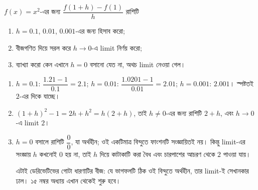 \documentclass[11pt]{article}
\begin{document}
 $f(x) = x^{2}$-এর জন্য $\dfrac{f(1+h)-f(1)}{h}$ রাশিটি
\begin{enumerate}
  \item $h = 0.1$, $0.01$, $0.001$-এর জন্য হিসাব করো;
  \item বীজগণিত দিয়ে সরল করে $h \to 0$-এ limit নির্ণয় করো;
  \item ব্যাখ্যা করো কেন এখানে $h = 0$ বসানো যেত না, অথচ limit নেওয়া গেল।
\end{enumerate}

\begin{sol}
\begin{enumerate}
  \item $h = 0.1$: $\dfrac{1.21-1}{0.1} = 2.1$;
        $h = 0.01$: $\dfrac{1.0201-1}{0.01} = 2.01$;
        $h = 0.001$: $2.001$। স্পষ্টতই $2$-এর দিকে যাচ্ছে।
  \item $(1+h)^{2} - 1 = 2h + h^{2} = h(2+h)$, তাই $h \neq 0$-এর জন্য
        রাশিটি $2+h$, এবং $h \to 0$-এ limit $2$।
  \item $h = 0$ বসালে রাশিটি $\dfrac{0}{0}$, যা অর্থহীন; ওই একটিমাত্র বিন্দুতে
        ফাংশনটি সংজ্ঞায়িতই নয়। কিন্তু limit-এর সংজ্ঞায় $h$ কখনোই $0$ হয় না,
        তাই $h$ দিয়ে কাটাকাটি করা বৈধ এবং চারপাশের আচরণ থেকে $2$ পাওয়া যায়।

        এটাই ডেরিভেটিভের গোটা ধারণাটির বীজ: যে ভাগফলটি ঠিক ওই বিন্দুতে
        অর্থহীন, তার limit-ই সেখানকার ঢাল। ১৫ নম্বর অধ্যায় এখান থেকেই
        শুরু হবে।
\end{enumerate}
\end{sol}
\end{document}

